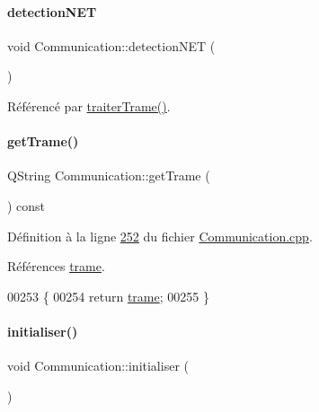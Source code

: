\paragraph{\texorpdfstring{detection\+N\+ET}{detectionNET}}
{\footnotesize\ttfamily void Communication\+::detection\+N\+ET (\begin{DoxyParamCaption}{ }\end{DoxyParamCaption})\hspace{0.3cm}{\ttfamily [signal]}}



Référencé par \hyperlink{_communication_8cpp_source_l00208}{traiter\+Trame()}.

\mbox{\label{class_communication_ad8dbd75b168bc02c76306361e650bbba}} 
\paragraph{\texorpdfstring{get\+Trame()}{getTrame()}}
{\footnotesize\ttfamily Q\+String Communication\+::get\+Trame (\begin{DoxyParamCaption}{ }\end{DoxyParamCaption}) const}



Définition à la ligne \hyperlink{_communication_8cpp_source_l00252}{252} du fichier \hyperlink{_communication_8cpp_source}{Communication.\+cpp}.



Références \hyperlink{_communication_8h_source_l00056}{trame}.


\begin{DoxyCode}
00253 \{
00254     \textcolor{keywordflow}{return} \hyperlink{class_communication_ac8f5004bfaaf7f538ba5ae93255f772b}{trame};
00255 \}
\end{DoxyCode}
\mbox{\label{class_communication_a2c10a52807bc7bdc520ec3fae622f672}} 
\paragraph{\texorpdfstring{initialiser()}{initialiser()}}
{\footnotesize\ttfamily void Communication\+::initialiser (\begin{DoxyParamCaption}{ }\end{DoxyParamCaption})}



